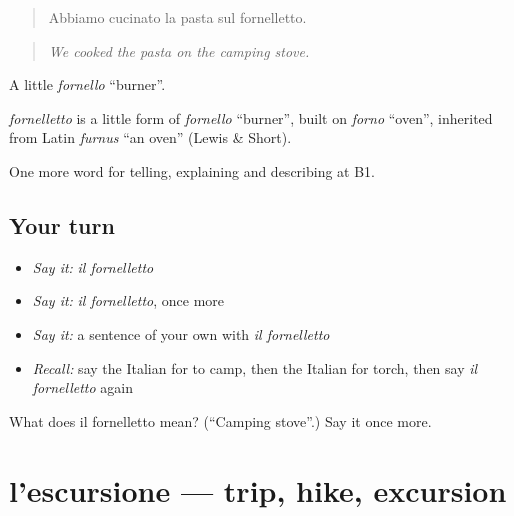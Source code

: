 \begin{quote}
Abbiamo cucinato la pasta sul fornelletto.
\end{quote}

\begin{quote}
\emph{We cooked the pasta on the camping stove.}
\end{quote}

A little \emph{fornello} \textquotedblleft{}burner\textquotedblright{}.

\begin{cousinweb}
\emph{fornelletto} is a little form of \emph{fornello} \textquotedblleft{}burner\textquotedblright{}, built on \emph{forno} \textquotedblleft{}oven\textquotedblright{}, inherited from Latin \emph{furnus} \textquotedblleft{}an oven\textquotedblright{} (Lewis \& Short).
\end{cousinweb}

\begin{grammarlens}[title={What you've built}]
One more word for telling, explaining and describing at B1.
\end{grammarlens}

\subsection*{Your turn}
\begin{itemize}
\raggedright
  \item \emph{Say it:} \emph{il fornelletto}
  \item \emph{Say it:} \emph{il fornelletto}, once more
  \item \emph{Say it:} a sentence of your own with \emph{il fornelletto}
  \item \emph{Recall:} say the Italian for to camp, then the Italian for torch, then say \emph{il fornelletto} again
\end{itemize}

\begin{tcolorbox}[breakable,colback=teal!4,colframe=teal!35!black,title={Before you move on}]
What does il fornelletto mean? (\textquotedblleft{}Camping stove\textquotedblright{}.) Say it once more.
\end{tcolorbox}
\section[l'escursione]{l'escursione — trip, hike, excursion}

\label{lesson:IT-C502-escursione}



